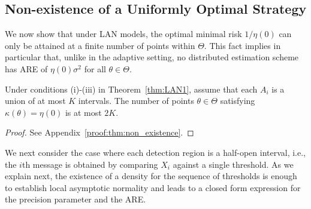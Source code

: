 \subsection{Non-existence of a Uniformly Optimal Strategy}
We now show that under LAN models, the optimal minimal risk $1/\eta(0)$ can only be attained at a finite number of points within $\Theta$. This fact implies in particular that, unlike in the adaptive setting, no distributed estimation scheme has ARE of $\eta(0)\sigma^2$ for all $\theta \in \Theta$. 

\begin{thm} \label{thm:non_existence}
Under conditions (i)-(iii) in Theorem~\ref{thm:LAN1}, assume that each $A_i$ is a union of at most $K$ intervals. The number of points $\theta \in \Theta$ satisfying $\kappa(\theta) = \eta(0)$ is at most $2K$. 
\end{thm}

\begin{proof}
See Appendix~\ref{proof:thm:non_existence}.
\end{proof}

We next consider the case where each detection region is a half-open interval, i.e., the $i$th message is obtained by comparing $X_i$ against a single threshold. As we explain next, the existence of a density for the sequence of thresholds is enough to establish local asymptotic normality and leads to a closed form expression for the precision parameter and the ARE.  


